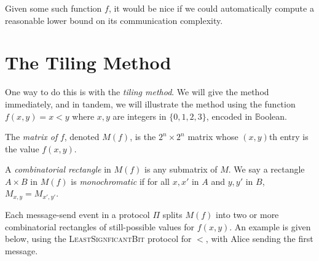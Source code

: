\documentclass[12pt]{article}
\begin{document}
Given some such function $f$, it would be nice if we could automatically compute
a reasonable lower bound on its communication complexity.

\section{The Tiling Method}

One way to do this is with the \emph{tiling method}.
We will give the method immediately, and in tandem, we will illustrate the method using
the function $f(x, y) = x < y$ where $x, y$ are integers in $\{ 0, 1, 2, 3 \}$, encoded in $\mathbb{B}$oolean.

\begin{definition}[$M(f)$]
The \emph{matrix of }$f$,
	denoted $M(f)$,
		is the $2^n \times 2^n$ matrix whose $(x, y)$th entry
		is the value $f(x, y)$.
\end{definition}

\begin{definition}
A \emph{combinatorial rectangle} in $M(f)$ is any submatrix of $M$.
We say a rectangle $A \times B$ in $M(f)$ is \emph{monochromatic}
if for all $x, x'$ in $A$ and $y, y'$ in $B$, $M_{x,y} = M_{x',y'}$.
\end{definition}

Each message-send event in a protocol $\Pi$ splits $M(f)$ into two or more
combinatorial rectangles of still-possible values for $f(x, y)$.
An example is given below, using the \textsc{LeastSignficantBit} protocol for $<$,
with Alice sending the first message.
\end{document}
